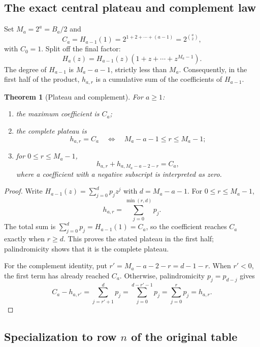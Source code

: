 \documentclass[11pt,oneside]{article}
\newtheorem{theorem}{Theorem}[section]
\theoremstyle{definition}
\theoremstyle{remark}
\begin{document}
\subsection{The exact central plateau and complement law}

Set $M_a=2^a=B_a/2$ and
\begin{equation}
 C_a=H_{a-1}(1)=2^{1+2+\cdots+(a-1)}
     =2^{\binom a2},
 \label{eq:Ca}
\end{equation}
with $C_0=1$.  Split off the final factor:
\[
 H_a(z)=H_{a-1}(z)(1+z+\cdots+z^{M_a-1}).
\]
The degree of $H_{a-1}$ is $M_a-a-1$, strictly less than $M_a$.
Consequently, in the first half of the product, $h_{a,r}$ is a cumulative
sum of the coefficients of $H_{a-1}$.

\begin{theorem}[Plateau and complement]
\label{thm:plateau-complement}
For $a\ge1$:
\begin{enumerate}
 \item the maximum coefficient is $C_a$;
 \item the complete plateau is
 \begin{equation}
  h_{a,r}=C_a
  \quad\Longleftrightarrow\quad
  M_a-a-1\le r\le M_a-1;
  \label{eq:plateau}
 \end{equation}
 \item for $0\le r\le M_a-1$,
 \begin{equation}
  h_{a,r}+h_{a,M_a-a-2-r}=C_a,
  \label{eq:complement-h}
 \end{equation}
 where a coefficient with a negative subscript is interpreted as zero.
\end{enumerate}
\end{theorem}

\begin{proof}
Write $H_{a-1}(z)=\sum_{j=0}^{d}p_jz^j$ with
$d=M_a-a-1$.  For $0\le r\le M_a-1$,
\[
 h_{a,r}=\sum_{j=0}^{\min(r,d)}p_j.
\]
The total sum is $\sum_{j=0}^{d}p_j=H_{a-1}(1)=C_a$, so the coefficient
reaches $C_a$ exactly when $r\ge d$.  This proves the stated plateau in the
first half; palindromicity shows that it is the complete plateau.

For the complement identity, put $r'=M_a-a-2-r=d-1-r$.
When $r'<0$, the first term has already reached $C_a$.  Otherwise,
palindromicity $p_j=p_{d-j}$ gives
\[
 C_a-h_{a,r'}
 =\sum_{j=r'+1}^{d}p_j
 =\sum_{j=0}^{d-r'-1}p_j
 =\sum_{j=0}^{r}p_j
 =h_{a,r}.
\]
\end{proof}

\subsection{Specialization to row \texorpdfstring{$n$}{n} of the original table}
\end{document}
